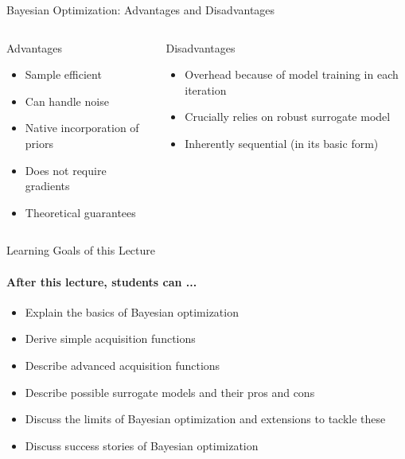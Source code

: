 \begin{frame}[c]{Bayesian Optimization: Advantages and Disadvantages}

\begin{columns}[T] %
\begin{column}{.48\textwidth}


\begin{block}{Advantages}
\begin{itemize}
  \item Sample efficient 
  \item Can handle noise
  \item Native incorporation of priors 
  \item Does not require gradients 
  \item Theoretical guarantees
\end{itemize}
\end{block}

\end{column}%

\hfill%
\pause 
\begin{column}{.48\textwidth}

\begin{block}{Disadvantages}
\begin{itemize}
  \item Overhead because of model training in each iteration 
  \item Crucially relies on robust surrogate model
  \item Inherently sequential (in its basic form)
\end{itemize}
\end{block}

\end{column}
\end{columns}

\end{frame}
\begin{frame}[c]{Learning Goals of this Lecture}
\framesubtitle{After this lecture, students can ...}

\begin{itemize}
    \item Explain the basics of Bayesian optimization
    \item Derive \alert{simple acquisition functions}
    \item Describe \alert{advanced acquisition functions}
    \item Describe possible \alert{surrogate models} and their pros and cons 
    \item Discuss the \alert{limits of Bayesian optimization} and extensions to tackle these
    \item Discuss \alert{success stories} of Bayesian optimization
\end{itemize}

\end{frame}


